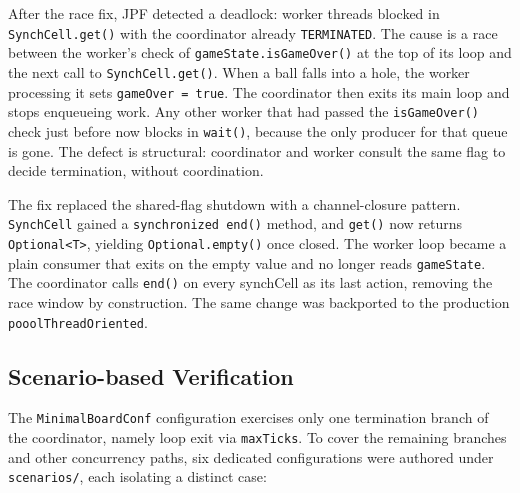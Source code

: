 \documentclass{scrartcl}
\begin{document}
After the race fix, JPF detected a deadlock: worker threads blocked in \texttt{SynchCell.get()} with the coordinator already \texttt{TERMINATED}. The cause is a race between the worker's check of \texttt{gameState.isGameOver()} at the top of its loop and the next call to \texttt{SynchCell.get()}. When a ball falls into a hole, the worker processing it sets \texttt{gameOver = true}. The coordinator then exits its main loop and stops enqueueing work. Any other worker that had passed the \texttt{isGameOver()} check just before now blocks in \texttt{wait()}, because the only producer for that queue is gone. The defect is structural: coordinator and worker consult the same flag to decide termination, without coordination.

The fix replaced the shared-flag shutdown with a channel-closure pattern. \texttt{SynchCell} gained a \texttt{synchronized end()} method, and \texttt{get()} now returns \texttt{Optional<T>}, yielding \texttt{Optional.empty()} once closed. The worker loop became a plain consumer that exits on the empty value and no longer reads \texttt{gameState}. The coordinator calls \texttt{end()} on every synchCell as its last action, removing the race window by construction. The same change was backported to the production \texttt{pooolThreadOriented}.

\subsection{Scenario-based Verification}

The \texttt{MinimalBoardConf} configuration exercises only one termination branch of the coordinator, namely loop exit via \texttt{maxTicks}. To cover the remaining branches and other concurrency paths, six dedicated configurations were authored under \texttt{scenarios/}, each isolating a distinct case:
\end{document}
